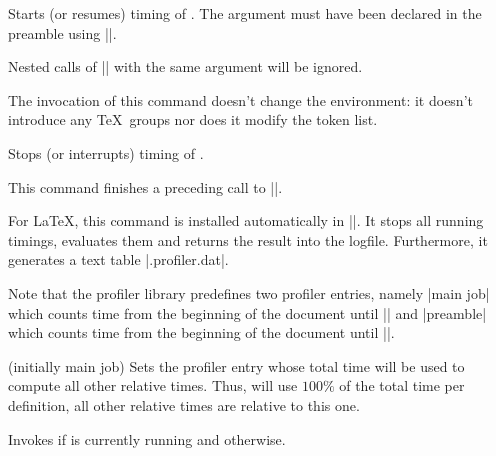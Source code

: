 \begin{command}{\pgfprofilestart{}}
	Starts (or resumes) timing of . The argument must have been declared in the preamble using |\pgfprofilenew|.

	Nested calls of |\pgfprofilestart| with the same argument will be ignored.

	The invocation of this command doesn't change the environment: it doesn't introduce any \TeX\ groups nor does it modify the token list.
\end{command}

\begin{command}{\pgfprofileend{}}
	Stops (or interrupts) timing of . 
	
	This command finishes a preceding call to |\pgfprofilestart|.
\end{command}

\begin{command}{\pgfprofilepostprocess}
	For \LaTeX, this command is installed automatically in ||. It stops all running timings, evaluates them and returns the result into the logfile. Furthermore, it generates a text table |\jobname.profiler.dat|.

	Note that the profiler library predefines two profiler entries, namely |main job| which counts time from the beginning of the document until |\pgfprofilepostprocess| and |preamble| which counts time from the beginning of the document until ||.
\end{command}

\begin{command}{\pgfprofilesetrel{} (initially main job)}
	Sets the profiler entry whose total time will be used to compute all other relative times. Thus,  will use $100\%$ of the total time per definition, all other relative times are relative to this one.
\end{command}

\begin{command}{\pgfprofileifisrunning{}}
	Invokes  if  is currently running and  otherwise.
\end{command}
